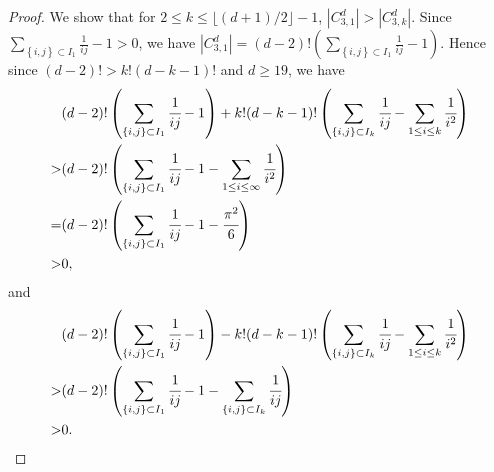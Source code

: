 \documentclass[12pt]{amsart}
\theoremstyle{definition}
\theoremstyle{remark}
\numberwithin{equation}{section}
\begin{document}
\begin{proof}
We show that for $2 \leq k \leq  \lfloor(d+1)/2\rfloor -1$, $|C_{3,1}^d|>|C_{3,k}^d|$.
Since $\sum\limits_{\left\{i,j\right\}\subset I_1}\frac{1}{ij}-1>0$,
we have $|C_{3,1}^d|=(d-2)!(\sum\limits_{\left\{i,j\right\}\subset I_1}\frac{1}{ij}-1).$
Hence since $(d-2)!>k!(d-k-1)!$ and $d \geq 19$, we have
\begin{displaymath}
\begin{aligned}
& (d-2)!\left(\sum\limits_{\left\{i,j\right\}\subset I_1}\cfrac{1}{ij}-1\right)+k!(d-k-1)!\left(\sum\limits_{\left\{i,j\right\}\subset I_k}\cfrac{1}{ij}-\sum\limits_{1 \leq i \leq k}\cfrac{1}{i^2}\right)\\
>&(d-2)!\left(\sum\limits_{\left\{i,j\right\}\subset I_1}\cfrac{1}{ij}-1-\sum\limits_{1 \leq i \leq \infty}\cfrac{1}{i^2}\right)\\
=&(d-2)!\left(\sum\limits_{\left\{i,j\right\}\subset I_1}\cfrac{1}{ij}-1-\cfrac{\pi^2}{6}\right)\\
>& 0,
\end{aligned}
\end{displaymath}
and
\begin{displaymath}
\begin{aligned}
& (d-2)!\left(\sum\limits_{\left\{i,j\right\}\subset I_1}\cfrac{1}{ij}-1\right)-k!(d-k-1)!\left(\sum\limits_{\left\{i,j\right\}\subset I_k}\cfrac{1}{ij}-\sum\limits_{1 \leq i \leq k}\cfrac{1}{i^2}\right)\\
>&(d-2)!\left(\sum\limits_{\left\{i,j\right\}\subset I_1}\cfrac{1}{ij}-1-\sum\limits_{\left\{i,j\right\}\subset I_k}\cfrac{1}{ij}\right)\\
>& 0.
\end{aligned}
\end{displaymath}

\end{proof}
\end{document}
